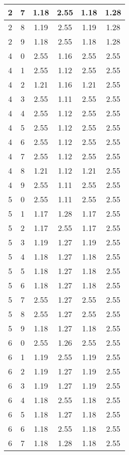 \begin{longtable}{|c|c||c||c||c|c|}
	2 & 7 & 1.18 & 2.55 & 1.18 & 1.28 \\ \hline
	2 & 8 & 1.19 & 2.55 & 1.19 & 1.28 \\ \hline
	2 & 9 & 1.18 & 2.55 & 1.18 & 1.28 \\ \hline
	4 & 0 & 2.55 & 1.16 & 2.55 & 2.55 \\ \hline
	4 & 1 & 2.55 & 1.12 & 2.55 & 2.55 \\ \hline
	4 & 2 & 1.21 & 1.16 & 1.21 & 2.55 \\ \hline
	4 & 3 & 2.55 & 1.11 & 2.55 & 2.55 \\ \hline
	4 & 4 & 2.55 & 1.12 & 2.55 & 2.55 \\ \hline
	4 & 5 & 2.55 & 1.12 & 2.55 & 2.55 \\ \hline
	4 & 6 & 2.55 & 1.12 & 2.55 & 2.55 \\ \hline
	4 & 7 & 2.55 & 1.12 & 2.55 & 2.55 \\ \hline
	4 & 8 & 1.21 & 1.12 & 1.21 & 2.55 \\ \hline
	4 & 9 & 2.55 & 1.11 & 2.55 & 2.55 \\ \hline
	5 & 0 & 2.55 & 1.11 & 2.55 & 2.55 \\ \hline
	5 & 1 & 1.17 & 1.28 & 1.17 & 2.55 \\ \hline
	5 & 2 & 1.17 & 2.55 & 1.17 & 2.55 \\ \hline
	5 & 3 & 1.19 & 1.27 & 1.19 & 2.55 \\ \hline
	5 & 4 & 1.18 & 1.27 & 1.18 & 2.55 \\ \hline
	5 & 5 & 1.18 & 1.27 & 1.18 & 2.55 \\ \hline
	5 & 6 & 1.18 & 1.27 & 1.18 & 2.55 \\ \hline
	5 & 7 & 2.55 & 1.27 & 2.55 & 2.55 \\ \hline
	5 & 8 & 2.55 & 1.27 & 2.55 & 2.55 \\ \hline
	5 & 9 & 1.18 & 1.27 & 1.18 & 2.55 \\ \hline
	6 & 0 & 2.55 & 1.26 & 2.55 & 2.55 \\ \hline
	6 & 1 & 1.19 & 2.55 & 1.19 & 2.55 \\ \hline
	6 & 2 & 1.19 & 1.27 & 1.19 & 2.55 \\ \hline
	6 & 3 & 1.19 & 1.27 & 1.19 & 2.55 \\ \hline
	6 & 4 & 1.18 & 2.55 & 1.18 & 2.55 \\ \hline
	6 & 5 & 1.18 & 1.27 & 1.18 & 2.55 \\ \hline
	6 & 6 & 1.18 & 2.55 & 1.18 & 2.55 \\ \hline
	6 & 7 & 1.18 & 1.28 & 1.18 & 2.55 \\ \hline

\end{longtable}
